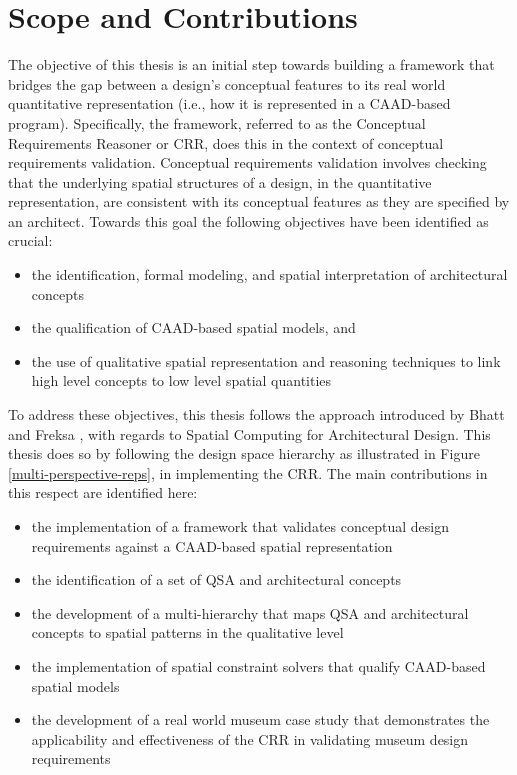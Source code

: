 \documentclass[12pt]{ucthesis}
\begin{document}
\section{Scope and Contributions}
The objective of this thesis is an initial step towards building a framework that bridges the gap between a design's conceptual features to its real world quantitative representation (i.e., how it is represented in a CAAD-based program). Specifically, the framework, referred to as the Conceptual Requirements Reasoner or CRR, does this in the context of conceptual requirements validation. Conceptual requirements validation involves checking that the underlying spatial structures of a design, in the quantitative representation, are consistent with its conceptual features as they are specified by an architect. Towards this goal the following objectives have been identified as crucial:
\begin{itemize}
\item the identification, formal modeling, and spatial interpretation of architectural concepts
\item the qualification of CAAD-based spatial models, and
\item the use of qualitative spatial representation and reasoning techniques to link high level concepts to low level spatial quantities  
\end{itemize}

To address these objectives, this thesis follows the approach introduced by Bhatt and Freksa \cite{bhatt-spatial-computing}, with regards to Spatial Computing for Architectural Design. This thesis does so by following the design space hierarchy as illustrated in Figure \ref{multi-perspective-reps}, in implementing the CRR. The main contributions in this respect are identified here:
\begin{itemize}
\item the implementation of a framework that validates conceptual design requirements against a CAAD-based spatial representation
\item the identification of a set of QSA and architectural concepts
\item the development of a multi-hierarchy that maps QSA and architectural concepts to spatial patterns in the qualitative level
\item the implementation of spatial constraint solvers that qualify CAAD-based spatial models
\item the development of a real world museum case study that demonstrates the applicability and effectiveness of the CRR in validating museum design requirements
\end{itemize}
\end{document}
